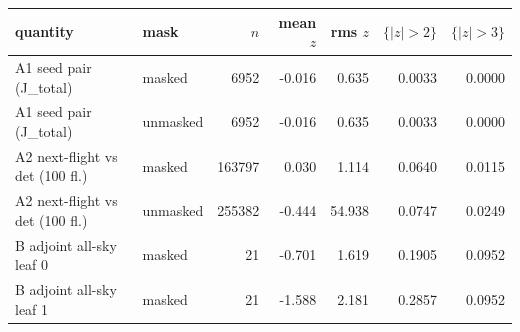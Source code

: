 \begin{tabular}{llrrrrr}
\toprule
quantity & mask & $n$ & mean $z$ & rms $z$ &
$\{|z|>2\}$ & $\{|z|>3\}$ \\
\midrule
A1 seed pair  (J\_total) & masked & 6952 & -0.016 & 0.635 & 0.0033 & 0.0000 \\
A1 seed pair  (J\_total) & unmasked & 6952 & -0.016 & 0.635 & 0.0033 & 0.0000 \\
A2 next-flight vs det  (100 fl.) & masked & 163797 & 0.030 & 1.114 & 0.0640 & 0.0115 \\
A2 next-flight vs det  (100 fl.) & unmasked & 255382 & -0.444 & 54.938 & 0.0747 & 0.0249 \\
B adjoint all-sky leaf 0 & masked & 21 & -0.701 & 1.619 & 0.1905 & 0.0952 \\
B adjoint all-sky leaf 1 & masked & 21 & -1.588 & 2.181 & 0.2857 & 0.0952 \\
\bottomrule
\end{tabular}
